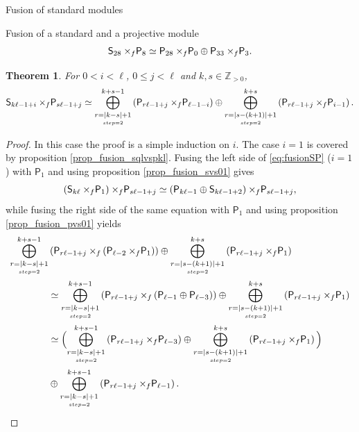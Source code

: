 \documentclass[reqno]{amsart}
\newtheorem{Thm}{Theorem}[section]
\newcommand{\ds}[1]{\mathsf S_{#1}}
\newcommand{\dP}[1]{\mathsf P_{#1}}
\newcommand{\xf}{\times\hspace{-0.27em}_f}
\newcommand{\lc}{\ell}
\begin{document}
\begin{section}{Fusion of standard modules}
\begin{subsection}{Fusion of a standard and a projective module}
\begin{equation}
	\ds{28} \xf \dP{8} \simeq  \dP{28} \xf \dP{0} \oplus \dP{33} \xf \dP{3}.
\end{equation}
\begin{Thm}\label{prop:fusion.standvsproj}
For $0<i<\lc$, $0 \leq j <\lc$ and $k,s\in\mathbb{Z}_{>0}$,
\begin{equation}\label{eq:fusionSP}
\ds{k \lc -1 +i} \xf \dP{s \lc -1+j} \simeq \overset{k+s-1}{\underset{\underset{step =2}{r = |k-s| + 1}}{\bigoplus}}\left( \dP{r \lc -1+j} \xf \dP{\lc -1-i}\right) \oplus \overset{k+s}{\underset{\underset{step =2}{r = |s-(k+1)| + 1}}{\bigoplus}} \left(\dP{r \lc -1+j} \xf \dP{i-1} \right)\text{.}
\end{equation}
\end{Thm}
\begin{proof}
In this case the proof is a simple induction on $i$. The case $i = 1$ is covered by proposition \ref{prop_fusion_sqlvspkl}. Fusing the left side of \eqref{eq:fusionSP} ($i=1$) with $\dP{1}$ and using proposition \ref{prop_fusion_svs01} gives
\begin{equation}\label{eq:fusionSP.G}
 \left( \ds{k \lc} \xf \dP{1} \right) \xf \dP{s \lc -1 +j} \simeq \left(\dP{k \lc -1} \oplus \ds{k \lc -1 + 2} \right) \xf \dP{s \lc -1 +j},
\end{equation}
while fusing the right side of the same equation with $\dP{1}$ and using proposition \ref{prop_fusion_pvs01} yields
\begin{align}\label{eq:fusionSP.D}
\overset{k+s-1}{\underset{\underset{step =2}{r = |k-s| + 1}}{\bigoplus}}&\left( \dP{r \lc -1+j} \xf \left( \dP{\lc -2} \xf \dP{1} \right)\right)  \oplus \overset{k+s}{\underset{\underset{step =2}{r = |s-(k+1)| + 1}}{\bigoplus}} \left(\dP{r \lc -1+j} \xf \dP{1} \right) \notag\\
& \simeq \overset{k+s-1}{\underset{\underset{step =2}{r = |k-s| + 1}}{\bigoplus}}\left( \dP{r \lc -1+j} \xf \left( \dP{\lc -1} \oplus \dP{\lc -3} \right)\right) \oplus \overset{k+s}{\underset{\underset{step =2}{r = |s-(k+1)| + 1}}{\bigoplus}} \left(\dP{r \lc -1+j} \xf \dP{1} \right) \notag\\
& \simeq \Big( \overset{k+s-1}{\underset{\underset{step =2}{r = |k-s| + 1}}{\bigoplus}}\left( \dP{r \lc -1+j} \xf  \dP{\lc -3} \right)\oplus \overset{k+s}{\underset{\underset{step =2}{r = |s-(k+1)| + 1}}{\bigoplus}} \left(\dP{r \lc -1+j} \xf \dP{1} \right)\Big) \notag\\
&\oplus \overset{k+s-1}{\underset{\underset{step =2}{r = |k-s| + 1}}{\bigoplus}}\left( \dP{r \lc -1+j} \xf  \dP{\lc -1} \right).

\end{align}
\end{proof}
\end{subsection}
\end{section}
\end{document}
